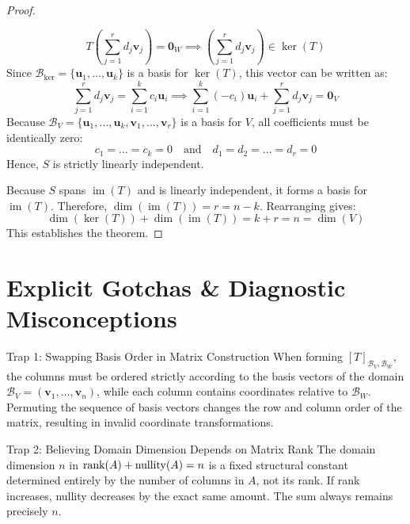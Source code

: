 \begin{proof}
\begin{enumerate}
\begin{equation*}
    T\left( \sum_{j=1}^r d_j \mathbf{v}_j \right) = \mathbf{0}_W \implies \left( \sum_{j=1}^r d_j \mathbf{v}_j \right) \in \ker(T)
    \end{equation*}
    Since $\mathcal{B}_{\ker} = \{\mathbf{u}_1, \dots, \mathbf{u}_k\}$ is a basis for $\ker(T)$, this vector can be written as:
    \begin{equation*}
    \sum_{j=1}^r d_j \mathbf{v}_j = \sum_{i=1}^k c_i \mathbf{u}_i \implies \sum_{i=1}^k (-c_i) \mathbf{u}_i + \sum_{j=1}^r d_j \mathbf{v}_j = \mathbf{0}_V
    \end{equation*}
    Because $\mathcal{B}_V = \{\mathbf{u}_1, \dots, \mathbf{u}_k, \mathbf{v}_1, \dots, \mathbf{v}_r\}$ is a basis for $V$, all coefficients must be identically zero:
    \begin{equation*}
    c_1 = \dots = c_k = 0 \quad \text{and} \quad d_1 = d_2 = \dots = d_r = 0
    \end{equation*}
    Hence, $S$ is strictly linearly independent.
\end{enumerate}
Because $S$ spans $\operatorname{im}(T)$ and is linearly independent, it forms a basis for $\operatorname{im}(T)$.
Therefore, $\dim(\operatorname{im}(T)) = r = n - k$. Rearranging gives:
\begin{equation*}
\dim(\ker(T)) + \dim(\operatorname{im}(T)) = k + r = n = \dim(V)
\end{equation*}
This establishes the theorem.
\end{proof}

\section{Explicit Gotchas \& Diagnostic Misconceptions}

\begin{trapbox}{Trap 1: Swapping Basis Order in Matrix Construction}
When forming $[T]_{\mathcal{B}_V, \mathcal{B}_W}$, the columns must be ordered strictly according to the basis vectors of the domain $\mathcal{B}_V = (\mathbf{v}_1, \dots, \mathbf{v}_n)$, while each column contains coordinates relative to $\mathcal{B}_W$. Permuting the sequence of basis vectors changes the row and column order of the matrix, resulting in invalid coordinate transformations.
\end{trapbox}

\begin{trapbox}{Trap 2: Believing Domain Dimension Depends on Matrix Rank}
The domain dimension $n$ in $\operatorname{rank}(A) + \operatorname{nullity}(A) = n$ is a fixed structural constant determined entirely by the number of columns in $A$, not its rank. If rank increases, nullity decreases by the exact same amount. The sum always remains precisely $n$.
\end{trapbox}

